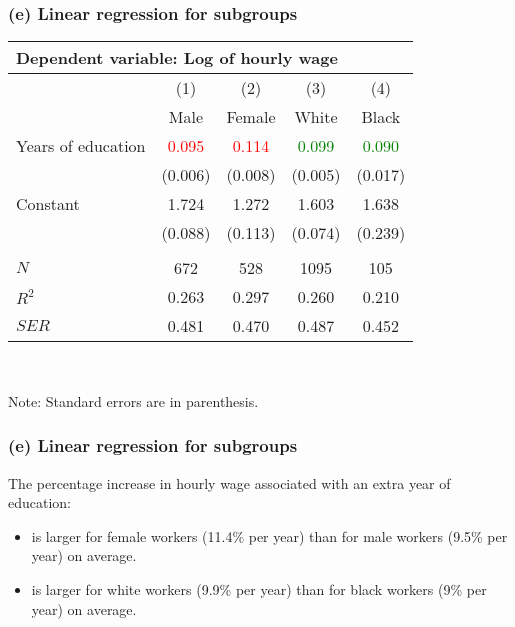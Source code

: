 \documentclass[11pt, xcolor=x11names,compress]{beamer}
\begin{document}
\begin{frame}[fragile,t]
\frametitle{(e) Linear regression for subgroups}
\vspace{5mm}
\begin{center}
\begin{threeparttable}
\setlength{\tabcolsep}{4pt}
\begin{tabular}{lcccc}
\hline
\multicolumn{5}{l}{Dependent variable: Log of hourly wage}\\
\hline
& (1) & (2) & (3) & (4) \\ 
\cline{2-5}
& Male & Female & White & Black \\
\hline
Years of education & \textcolor{red}{0.095} & \textcolor{red}{0.114} & \textcolor{green}{0.099} & \textcolor{green}{0.090} \\
& (0.006) & (0.008) & (0.005) & (0.017) \\
Constant & 1.724 & 1.272 & 1.603  & 1.638 \\
& (0.088) & (0.113) & (0.074) & (0.239) \\
& & & & \\
$N$ & 672 & 528 & 1095 & 105 \\
$R^2$ & 0.263 & 0.297& 0.260 & 0.210\\
$SER$ & 0.481 & 0.470 & 0.487 & 0.452 \\
\hline
\end{tabular}
\\
\begin{tablenotes}[flushleft]
\footnotesize
Note: Standard errors are in parenthesis.
\end{tablenotes}
\end{threeparttable}
\end{center}
\end{frame}

\begin{frame}[fragile,t]
\frametitle{(e) Linear regression for subgroups}
\vspace{3mm}
The percentage increase in hourly wage associated with an extra year of education:
\vspace{3mm}
\begin{itemize}
    \item is larger for female workers (11.4\% per year) than for male workers (9.5\% per year) on average.
    \item is larger for white workers (9.9\% per year) than for black workers (9\% per year) on average.
    \vspace{3mm}
\end{itemize}
\end{frame}
\end{document}
